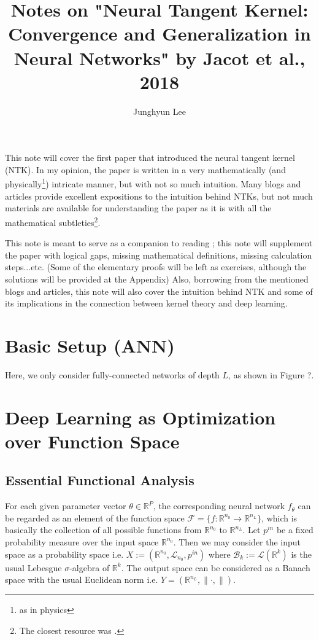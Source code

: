 \documentclass{article}
\theoremstyle{plain}
\theoremstyle{definition}
\theoremstyle{remark}
\begin{document}
\title{%
  \huge Notes on "Neural Tangent Kernel: Convergence and Generalization in Neural Networks" by Jacot et al., 2018
  }
\author[1,2]{Junghyun Lee}
\maketitle

This note will cover the first paper\cite{NTK} that introduced the neural tangent kernel (NTK).
In my opinion, the paper is written in a very mathematically (and physically\footnote{as in physics}) intricate manner, but with not so much intuition.
Many blogs and articles \cite{NTK-Rajat, NTK-CMU, NTK-Huszar, NTK-oxford} provide excellent expositions to the intuition behind NTKs, but not much materials are available for understanding the paper as it is with all the mathematical subtleties\footnote{The closest resource was \cite{NTK-Jinwoo}.}.

This note is meant to serve as a companion to reading \cite{NTK}; this note will supplement the paper with logical gaps, missing mathematical definitions, missing calculation steps...etc.
(Some of the elementary proofs will be left as exercises, although the solutions will be provided at the Appendix)
Also, borrowing from the mentioned blogs and articles, this note will also cover the intuition behind NTK and some of its implications in the connection between kernel theory and deep learning.



\section{Basic Setup (ANN)}
Here, we only consider fully-connected networks of depth $L$, as shown in Figure ?.


\section{Deep Learning as Optimization over Function Space}
\subsection{Essential Functional Analysis}
For each given parameter vector $\theta \in \mathbb{R}^P$, the corresponding neural network $f_\theta$ can be regarded as an element of the function space $\mathcal{F} = \{f : \mathbb{R}^{n_0} \rightarrow \mathbb{R}^{n_L}\}$, which is basically the collection of all possible functions from $\mathbb{R}^{n_0}$ to $\mathbb{R}^{n_L}$.
Let $p^{in}$ be a fixed probability measure over the input space $\mathbb{R}^{n_0}$.
Then we may consider the input space as a probability space i.e. $X := (\mathbb{R}^{n_0}, \mathcal{L}_{n_0}, p^{in})$ where $\mathcal{B}_k := \mathcal{L}(\mathbb{R}^k)$ is the usual Lebesgue $\sigma$-algebra of $\mathbb{R}^k$.
The output space can be considered as a Banach space with the usual Euclidean norm i.e. $Y = (\mathbb{R}^{n_L}, \lVert \cdot, \rVert)$.
\end{document}
